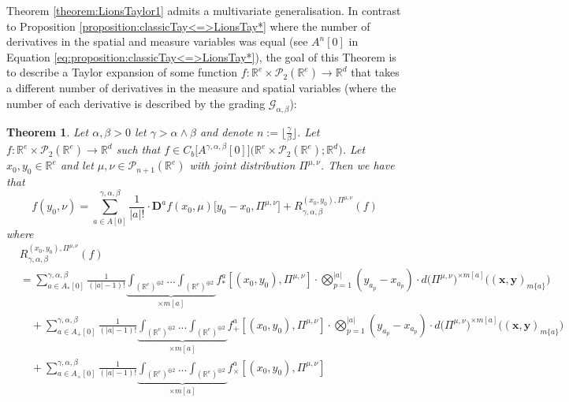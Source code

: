 \documentclass[a4paper,11pt,twoside]{article}
\numberwithin{equation}{section}
\theoremstyle{plain}
\newtheorem{theorem}{Theorem}[section]
\newcommand{\bR}{\mathbb{R}}
\newcommand{\cP}{\mathcal{P}}
\newcommand{\scG}{\mathscr{G}}
\newcommand{\rD}{\mathbf{D}}
\newcommand{\1}{\mathbbm{1}}
\begin{document}
	Theorem \ref{theorem:LionsTaylor1} admits a multivariate generalisation. In contrast to Proposition \ref{proposition:classicTay<=>LionsTay*} where the number of derivatives in the spatial and measure variables was equal (see $A^n[0]$ in Equation \eqref{eq:proposition:classicTay<=>LionsTay*}), the goal of this Theorem is to describe a Taylor expansion of some function $f:\bR^e \times \cP_2(\bR^e) \to \bR^d$ that takes a different number of derivatives in the measure and spatial variables (where the number of each derivative is described by the grading $\scG_{\alpha, \beta}$):
	\begin{theorem}
		\label{theorem:LionsTaylor2}
		Let $\alpha, \beta>0$ let $\gamma>\alpha\wedge \beta$ and denote $n:= \big\lfloor \tfrac{\gamma}{\beta} \big\rfloor$. Let $f: \bR^e \times \cP_2(\bR^e) \to \bR^d$ such that $f\in C_b\big[ A^{\gamma, \alpha, \beta}[0] \big]\big(\bR^e \times \cP_2(\bR^e); \bR^d\big)$. Let $x_0, y_0\in \bR^e$ and let $\mu, \nu\in \cP_{n+1}(\bR^e)$ with joint distribution $\Pi^{\mu, \nu}$. Then we have that
		\begin{equation}
			\label{eq:FullTaylorExpansion}
			f(y_0, \nu) = \sum_{a\in A[0]}^{\gamma, \alpha, \beta} \frac{1}{|a|!}\cdot \rD^af(x_0, \mu)\big[ y_0 - x_0, \Pi^{\mu, \nu} \big] + R_{\gamma, \alpha, \beta}^{(x_0, y_0), \Pi^{\mu, \nu}}(f)
		\end{equation}
		where
		\begin{align}
			\nonumber
			&R_{\gamma, \alpha, \beta}^{(x_0, y_0), \Pi^{\mu, \nu}}(f) 
			\\
			\nonumber
			&= \sum_{a\in A_{\ast}[0]}^{\gamma, \alpha, \beta} \tfrac{1}{(|a| - 1)!} \underbrace{ \int_{(\bR^e)^{\oplus 2}} ... \int_{(\bR^e)^{\oplus 2}} }_{\times m[a]} f_{\ast}^{a}[ (x_0, y_0), \Pi^{\mu, \nu}] 
			\cdot 
			\bigotimes_{p=1}^{|a|} ( y_{a_p} - x_{a_p}) \cdot d\big( \Pi^{\mu, \nu}\big)^{\times m[a]} \Big( (\boldsymbol{x}, \boldsymbol{y})_{m\{a\}}\Big)
			\\
			\nonumber
			&\quad+\sum_{a\in A_{+}[0]}^{\gamma, \alpha, \beta} \tfrac{1}{(|a| - 1)!} \underbrace{ \int_{(\bR^e)^{\oplus 2}} ... \int_{(\bR^e)^{\oplus 2}} }_{\times m[a]} f_{+}^{a}[ (x_0, y_0), \Pi^{\mu, \nu}] 
			\cdot 
			\bigotimes_{p=1}^{|a|} ( y_{a_p} - x_{a_p}) \cdot d\big( \Pi^{\mu, \nu}\big)^{\times m[a]} \Big( (\boldsymbol{x}, \boldsymbol{y})_{m\{a\}}\Big)
			\\
			\label{eq:theorem:LionsTaylor2_remainder1}
			&\quad+\sum_{a\in A_{\times}[0]}^{\gamma, \alpha, \beta} \tfrac{1}{(|a| - 1)!} \underbrace{ \int_{(\bR^e)^{\oplus 2}} ... \int_{(\bR^e)^{\oplus 2}} }_{\times m[a]} f_{\times}^{a}[ (x_0, y_0), \Pi^{\mu, \nu}] 

\end{align}
\end{theorem}
\end{document}
